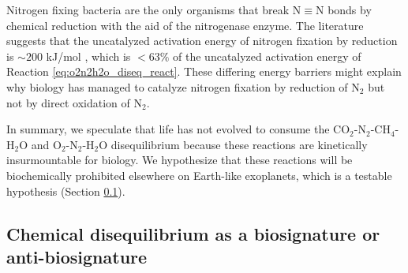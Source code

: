 Nitrogen fixing bacteria are the only organisms that break $\mathrm{N \equiv N}$ bonds by chemical reduction with the aid of the nitrogenase enzyme. The literature suggests that the uncatalyzed activation energy of nitrogen fixation by reduction is $\sim 200$ kJ/mol \citep{Hageman_1980}, which is $< 63\%$ of the uncatalyzed activation energy of Reaction \eqref{eq:o2n2h2o_diseq_react}. These differing energy barriers might explain why biology has managed to catalyze nitrogen fixation by reduction of N$_2$ but not by direct oxidation of N$_2$.

In summary, we speculate that life has not evolved to consume the CO$_2$-N$_2$-CH$_4$-H$_2$O and O$_2$-N$_2$-H$_2$O disequilibrium because these reactions are kinetically insurmountable for biology. We hypothesize that these reactions will be biochemically prohibited elsewhere on Earth-like exoplanets, which is a testable hypothesis 
(Section \ref{}).

\subsection{Chemical disequilibrium as a biosignature or anti-biosignature}
